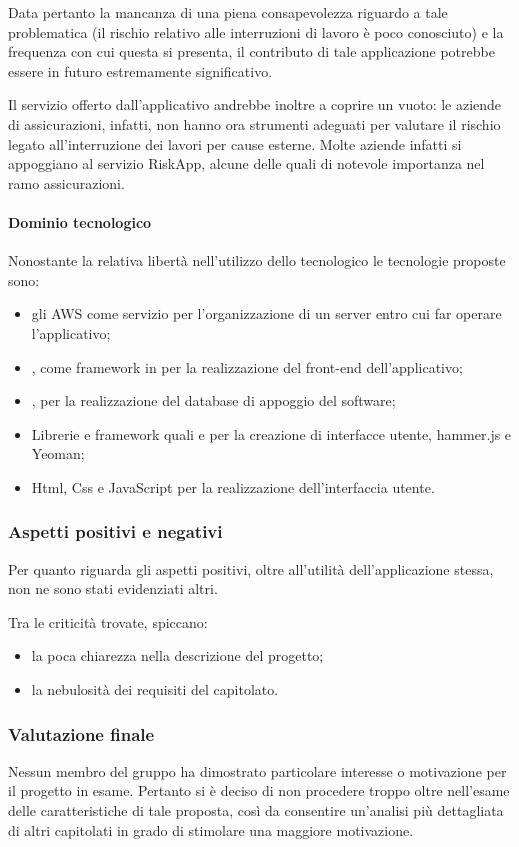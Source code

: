 			Data pertanto la mancanza di una piena consapevolezza riguardo a tale problematica (il rischio relativo alle interruzioni di lavoro è poco conosciuto) e la frequenza con cui questa si presenta, il contributo di tale applicazione potrebbe essere in futuro estremamente significativo.

			Il servizio offerto dall'applicativo andrebbe inoltre a coprire un vuoto: le aziende di assicurazioni, infatti, non hanno ora strumenti adeguati per valutare il rischio legato all'interruzione dei lavori per cause esterne. Molte aziende infatti si appoggiano al servizio RiskApp, alcune delle quali di notevole importanza nel ramo assicurazioni.
			\paragraph{Dominio tecnologico}
			Nonostante la relativa libertà nell'utilizzo dello  tecnologico le tecnologie proposte sono:
			\begin{itemize}
				\item gli AWS come servizio per l'organizzazione di un server entro cui far operare l'applicativo;
				\item {}, come framework in  per la realizzazione del front-end dell'applicativo;
				\item {}, per la realizzazione del database di appoggio del software;
				\item Librerie e framework quali  e  per la creazione di interfacce utente, hammer.js e Yeoman;
				\item Html, Css e JavaScript per la realizzazione dell'interfaccia utente.
			\end{itemize}
		\subsubsection{Aspetti positivi e negativi}
		Per quanto riguarda gli aspetti positivi, oltre all'utilità dell'applicazione stessa, non ne sono stati evidenziati altri.
		
		Tra le criticità trovate, spiccano:
		\begin{itemize}
			\item la poca chiarezza nella descrizione del progetto;
			\item la nebulosità dei requisiti del capitolato.
		\end{itemize}
		\subsubsection{Valutazione finale}
		Nessun membro del gruppo ha dimostrato particolare interesse o motivazione per il progetto in esame. Pertanto si è deciso di non procedere 
		troppo oltre nell'esame delle caratteristiche di tale proposta, così da consentire un'analisi più dettagliata di altri capitolati in grado 
		di stimolare una maggiore motivazione.
		
